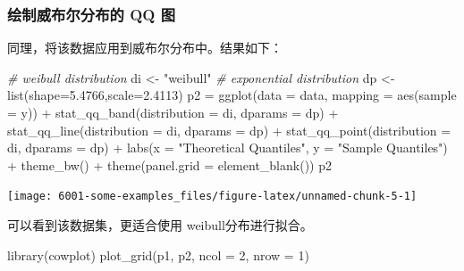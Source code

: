 \documentclass[
]{book}
\newenvironment{Shaded}{\begin{snugshade}}{\end{snugshade}}
\newcommand{\AttributeTok}[1]{\textcolor[rgb]{0.77,0.63,0.00}{#1}}
\newcommand{\CommentTok}[1]{\textcolor[rgb]{0.56,0.35,0.01}{\textit{#1}}}
\newcommand{\DecValTok}[1]{\textcolor[rgb]{0.00,0.00,0.81}{#1}}
\newcommand{\FloatTok}[1]{\textcolor[rgb]{0.00,0.00,0.81}{#1}}
\newcommand{\FunctionTok}[1]{\textcolor[rgb]{0.00,0.00,0.00}{#1}}
\newcommand{\NormalTok}[1]{#1}
\newcommand{\OtherTok}[1]{\textcolor[rgb]{0.56,0.35,0.01}{#1}}
\newcommand{\SpecialCharTok}[1]{\textcolor[rgb]{0.00,0.00,0.00}{#1}}
\newcommand{\StringTok}[1]{\textcolor[rgb]{0.31,0.60,0.02}{#1}}
\begin{document}
\hypertarget{ux7ed8ux5236ux5a01ux5e03ux5c14ux5206ux5e03ux7684-qq-ux56fe}{%
\subsubsection{绘制威布尔分布的 QQ 图}\label{ux7ed8ux5236ux5a01ux5e03ux5c14ux5206ux5e03ux7684-qq-ux56fe}}

同理，将该数据应用到威布尔分布中。结果如下：

\begin{Shaded}
\begin{Highlighting}[]
\CommentTok{\# weibull distribution}
\NormalTok{di }\OtherTok{\textless{}{-}} \StringTok{"weibull"} \CommentTok{\# exponential distribution}
\NormalTok{dp }\OtherTok{\textless{}{-}} \FunctionTok{list}\NormalTok{(}\AttributeTok{shape=}\FloatTok{5.4766}\NormalTok{,}\AttributeTok{scale=}\FloatTok{2.4113}\NormalTok{)}
\NormalTok{p2 }\OtherTok{=} \FunctionTok{ggplot}\NormalTok{(}\AttributeTok{data =}\NormalTok{ data, }\AttributeTok{mapping =} \FunctionTok{aes}\NormalTok{(}\AttributeTok{sample =}\NormalTok{ y)) }\SpecialCharTok{+}
  \FunctionTok{stat\_qq\_band}\NormalTok{(}\AttributeTok{distribution =}\NormalTok{ di, }\AttributeTok{dparams =}\NormalTok{ dp) }\SpecialCharTok{+}
  \FunctionTok{stat\_qq\_line}\NormalTok{(}\AttributeTok{distribution =}\NormalTok{ di, }\AttributeTok{dparams =}\NormalTok{ dp) }\SpecialCharTok{+}
  \FunctionTok{stat\_qq\_point}\NormalTok{(}\AttributeTok{distribution =}\NormalTok{ di, }\AttributeTok{dparams =}\NormalTok{ dp) }\SpecialCharTok{+}
  \FunctionTok{labs}\NormalTok{(}\AttributeTok{x =} \StringTok{"Theoretical Quantiles"}\NormalTok{, }\AttributeTok{y =} \StringTok{"Sample Quantiles"}\NormalTok{) }\SpecialCharTok{+}
  \FunctionTok{theme\_bw}\NormalTok{() }\SpecialCharTok{+} 
  \FunctionTok{theme}\NormalTok{(}\AttributeTok{panel.grid =} \FunctionTok{element\_blank}\NormalTok{())}
\NormalTok{p2}
\end{Highlighting}
\end{Shaded}

\begin{center}\texttt{[image: 6001-some-examples\_files/figure-latex/unnamed-chunk-5-1]} \end{center}

可以看到该数据集，更适合使用 weibull分布进行拟合。

\begin{Shaded}
\begin{Highlighting}[]
\FunctionTok{library}\NormalTok{(cowplot)}
\FunctionTok{plot\_grid}\NormalTok{(p1, p2, }\AttributeTok{ncol =} \DecValTok{2}\NormalTok{, }\AttributeTok{nrow =} \DecValTok{1}\NormalTok{)}
\end{Highlighting}
\end{Shaded}
\end{document}
